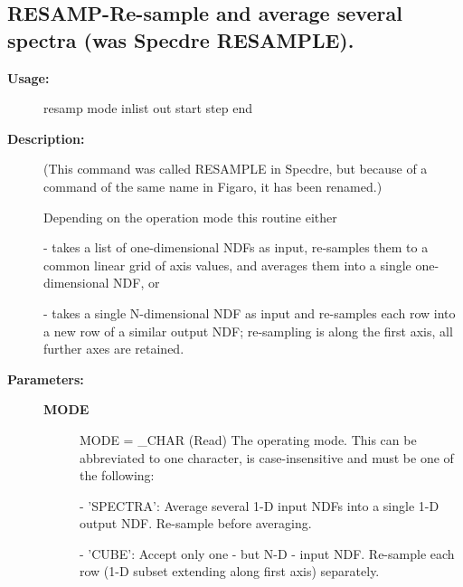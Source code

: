 \begin{description}
\begin{description}
\end{description}
\subsection{RESAMP-\label{RESAMP}Re-sample and average several spectra (was Specdre RESAMPLE).}
\begin{description}

\item [\textbf{Usage:}]

   resamp mode inlist out start step end


\item [\textbf{Description:}]

   (This command was called RESAMPLE in Specdre, but because of a
   command of the same name in Figaro, it has been renamed.)

   Depending on the operation mode this routine either

   -  takes a list of one-dimensional NDFs as input, re-samples them
      to a common linear grid of axis values, and averages them into
      a single one-dimensional NDF, or

   -  takes a single N-dimensional NDF as input and re-samples each
      row into a new row of a similar output NDF; re-sampling is
      along the first axis, all further axes are retained.


\item [\textbf{Parameters:}]
\begin{description}
\item [\textbf{MODE}]
MODE = \_CHAR (Read)
   The operating mode. This can be abbreviated to one character,
   is case-insensitive and must be one of the following:

   -  'SPECTRA': Average several 1-D input NDFs into a single
      1-D output NDF. Re-sample before averaging.

   -  'CUBE': Accept only one - but N-D - input NDF. Re-sample each
      row (1-D subset extending along first axis) separately.


\end{description}
\end{description}
\end{description}
